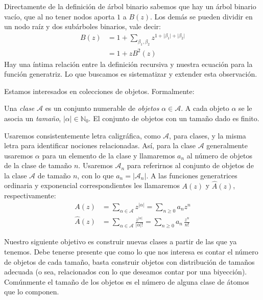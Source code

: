   Directamente de la definición de árbol binario%
  sabemos que hay un árbol binario vacío,
  que al no tener nodos aporta \(1\) a \(B(z)\).
  Los demás se pueden dividir en un nodo raíz
  y dos subárboles binarios,
  vale decir:
  \begin{align*}
    B(z)
      &= 1 + \sum_{\beta_1, \beta_2}
	       z^{1 + \lvert \beta_1 \rvert
		    + \lvert \beta_2 \rvert} \\
      &= 1 + z B^2 (z)
  \end{align*}
  Hay una íntima relación entre la definición recursiva
  y nuestra ecuación para la función generatriz.
  Lo que buscamos es sistematizar y extender esta observación.

  Estamos interesados
  en colecciones de objetos.
  Formalmente:
  \begin{definition}
    Una \emph{clase} \(\mathcal{A}\)
    es un conjunto numerable
    de \emph{objetos} \(\alpha \in \mathcal{A}\).
    A cada objeto \(\alpha\) se le asocia un \emph{tamaño},
    \(\lvert \alpha \rvert \in \mathbb{N}_0\).
    El conjunto de objetos con un tamaño dado es finito.
  \end{definition}
  Usaremos consistentemente letra caligráfica,
  como \(\mathcal{A}\),
  para clases,
  y la misma letra para identificar nociones relacionadas.
  Así,
  para la clase \(\mathcal{A}\)
  generalmente usaremos \(\alpha\) para un elemento de la clase
  y llamaremos \(a_n\)
  al número de objetos de la clase de tamaño \(n\).
  Usaremos \(\mathcal{A}_n\)
  para referirnos al conjunto de objetos de la clase \(\mathcal{A}\)
  de tamaño \(n\),
  con lo que \(a_n = \lvert \mathcal{A}_n \rvert\).
  A las funciones generatrices ordinaria y exponencial
  correspondientes
  les llamaremos \(A(z)\) y \(\widehat{A}(z)\),
  respectivamente:
  \begin{align*}
    A(z)
      &= \sum_{\alpha \in \mathcal{A}} z^{\lvert \alpha \rvert}
       = \sum_{n \ge 0} a_n z^n \\
    \widehat{A}(z)
      &= \sum_{\alpha \in \mathcal{A}}
	   \frac{z^{\lvert \alpha \rvert}}{\lvert \alpha \rvert !}
       = \sum_{n \ge 0} a_n \, \frac{z^n}{n!}
  \end{align*}

  Nuestro siguiente objetivo es construir nuevas clases
  a partir de las que ya tenemos.
  Debe tenerse presente que como lo que nos interesa
  es contar el número de objetos de cada tamaño,
  basta construir objetos con distribución de tamaños adecuada
  (o sea,
   relacionados con lo que deseamos contar por una biyección).
  Comúnmente el tamaño de los objetos es el número de alguna clase de átomos
  que lo componen.

